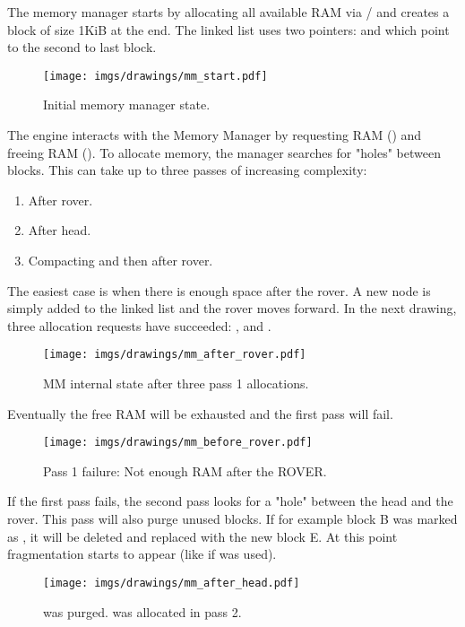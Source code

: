\documentclass[book.tex]{subfiles}
\begin{document}
The memory manager starts by allocating all available RAM via / and creates a  block of size 1KiB at the end. The linked list uses two pointers:  and  which point to the second to last block.
 \par
\begin{figure}[H]
\centering
 \texttt{[image: imgs/drawings/mm\_start.pdf]}
 \caption{Initial memory manager state.}
 \end{figure}
 \par
 The engine interacts with the Memory Manager by requesting RAM () and freeing RAM (). To allocate memory, the manager searches for "holes" between blocks. This can take up to three passes of increasing complexity:
\begin{enumerate}
\item After rover.
\item After head.
\item Compacting and then after rover.
\end{enumerate}
\par
  The easiest case is when there is enough space after the rover. A new node is simply added to the linked list and the rover moves forward. In the next drawing, three allocation requests have succeeded: ,  and .\\
  \par
\begin{figure}[H]
\centering
 \texttt{[image: imgs/drawings/mm\_after\_rover.pdf]}
 \caption{MM internal state after three pass 1 allocations.}
 \end{figure}
 \par
Eventually the free RAM will be exhausted and the first pass will fail.
  \par
\begin{figure}[H]
\centering
 \texttt{[image: imgs/drawings/mm\_before\_rover.pdf]}
 \caption{Pass 1 failure: Not enough RAM after the ROVER.}
 \end{figure}
 \par
 If the first pass fails, the second pass looks for a "hole" between the head and the rover. This pass will also purge unused blocks. If for example block B was marked as , it will be deleted and replaced with the new block E. At this point fragmentation starts to appear (like if  was used).\\
 \begin{figure}[H]
\centering
 \texttt{[image: imgs/drawings/mm\_after\_head.pdf]}
 \caption{ was purged.  was allocated in pass 2.}
 \end{figure}
\end{document}
